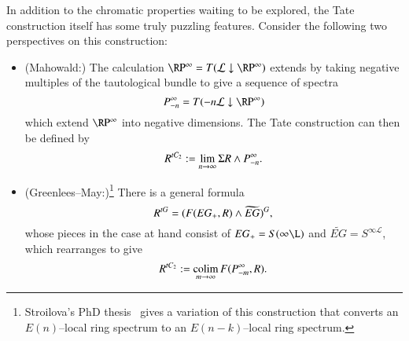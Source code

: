In addition to the chromatic properties waiting to be explored, the Tate construction itself has some truly puzzling features.  Consider the following two perspectives on this construction:
\begin{itemize}
    \item (Mahowald:) The calculation $\RP^\infty = T(\mathcal L \downarrow \RP^\infty)$ extends by taking negative multiples of the tautological bundle to give a sequence of spectra \[P^\infty_{-n} = T(-n\mathcal L \downarrow \RP^\infty)\] which extend $\RP^\infty$ into negative dimensions.  The Tate construction can then be defined by \[R^{tC_2} := \lim_{n \to \infty} \Sigma R \wedge P^\infty_{-n}.\]
    \item (Greenlees--May:)\footnote{Stroilova's PhD thesis~\cite{Stroilova} gives a variation of this construction that converts an $E(n)$--local ring spectrum to an $E(n-k)$--local ring spectrum.} There is a general formula \[R^{tG} = (F(EG_+, R) \wedge \widetilde{EG})^G,\] whose pieces in the case at hand consist of $EG_+ = S(\infty \L)$ and $\widetilde{EG} = S^{\infty \mathcal L}$, which rearranges to give \[R^{tC_2} := \operatorname*{colim}_{m \to \infty} F(P^\infty_{-m}, R).\]
\end{itemize}
